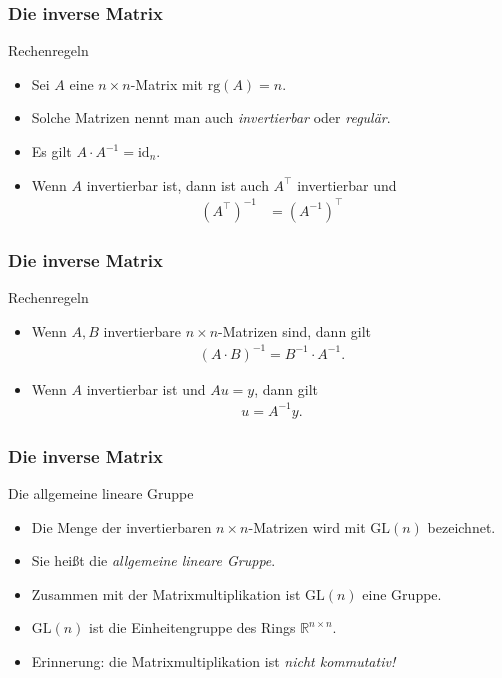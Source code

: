 \documentclass{beamer}
\renewcommand{\emph}[1]{{\textcolor{solarizedRed}{\itshape #1}}}
\newcommand\RR{\mathbb R}
\newcommand{\id}{\mathrm{id}}
\newcommand{\trans}{\top}
\renewcommand{\ae}{\"a}
\newcommand{\rk}{\mathrm{rg}}
\newcommand{\GL}{\mathrm{GL}}
\newcommand{\mytitle}{Die inverse Matrix}
\begin{document}
\begin{frame}\frametitle{\mytitle}
	\begin{block}{Rechenregeln}
	\begin{itemize}
		\item Sei $A$ eine $n\times n$-Matrix mit $\rk(A)=n$.
		\item Solche Matrizen nennt man auch \emph{invertierbar} oder \emph{regul\ae r}.
		\item Es gilt $A\cdot A^{-1}=\id_n$.
		\item Wenn $A$ invertierbar ist, dann ist auch $A^\trans$ invertierbar und
			\begin{align*}
				(A^\trans)^{-1}&=(A^{-1})^\trans
			\end{align*}
	\end{itemize}	
	\end{block}
\end{frame}

\begin{frame}\frametitle{\mytitle}
	\begin{block}{Rechenregeln}
	\begin{itemize}
		\item Wenn $A,B$ invertierbare $n\times n$-Matrizen sind, dann gilt
			\begin{align*}
				(A\cdot B)^{-1}=B^{-1}\cdot A^{-1}.
			\end{align*}
		\item Wenn $A$ invertierbar ist und $Au=y$, dann gilt
			\begin{align*}
				u=A^{-1}y.
			\end{align*}
	\end{itemize}	
	\end{block}
\end{frame}

\begin{frame}\frametitle{\mytitle}
	\begin{block}{Die allgemeine lineare Gruppe}
		\begin{itemize}
			\item Die Menge der invertierbaren $n\times n$-Matrizen wird mit $\GL(n)$ bezeichnet.
			\item Sie hei\ss t die \emph{allgemeine lineare Gruppe}.
			\item Zusammen mit der Matrixmultiplikation ist $\GL(n)$ eine Gruppe.
			\item $\GL(n)$ ist die Einheitengruppe des Rings $\RR^{n\times n}$.
			\item \alert{Erinnerung:} die Matrixmultiplikation ist \emph{nicht kommutativ!}
		\end{itemize}	
	\end{block}
\end{frame}
\end{document}

